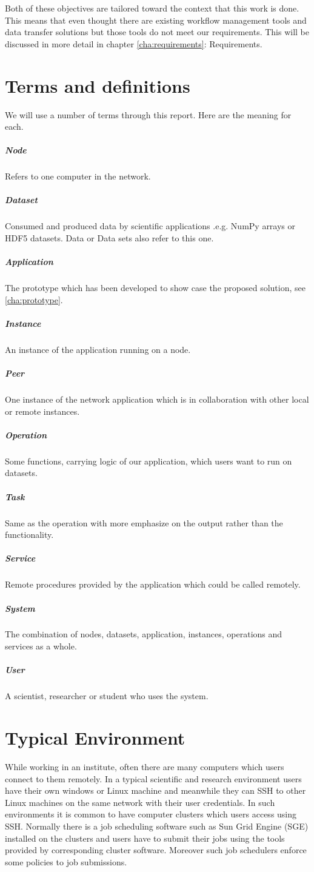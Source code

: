 Both of these objectives are tailored toward the context that this work is done. 
This means that even thought there are existing workflow management tools and data transfer solutions 
but those tools do not meet our requirements. 
This will be discussed in more detail in chapter \ref{cha:requirements}: Requirements.

\section{Terms and definitions}
We will use a number of terms through this report. Here are the meaning for each.
\subparagraph{Node}
Refers to one computer in the network.
\subparagraph{Dataset}
Consumed and produced data by scientific applications .e.g. NumPy arrays or HDF5 datasets.
Data or Data sets also refer to this one.
\subparagraph{Application}
The prototype which has been developed to show case the proposed solution, see \ref{cha:prototype}.
\subparagraph{Instance}
An instance of the application running on a node.
\subparagraph{Peer}
One instance of the network application which is in collaboration with other local or remote instances.
\subparagraph{Operation}
Some functions, carrying logic of our application, which users want to run on datasets.
\subparagraph{Task}
Same as the operation with more emphasize on the output rather than the functionality.
\subparagraph{Service}
Remote procedures provided by the application which could be called remotely.
\subparagraph{System}
The combination of nodes, datasets, application, instances, operations and services as a whole.
\subparagraph{User}
A scientist, researcher or student who uses the system.

\section{Typical Environment}
While working in an institute, often there are many computers which users connect to them remotely. In a typical
scientific and research environment users have their own windows or Linux machine and meanwhile they can SSH to other
Linux machines on the same network with their user credentials. In such environments it is common to have computer clusters
which users access using SSH. Normally there is a job scheduling software such as Sun Grid Engine (SGE) installed on the clusters
and users have to submit their jobs using the tools provided by corresponding cluster software.
Moreover such job schedulers enforce some policies to job submissions.

